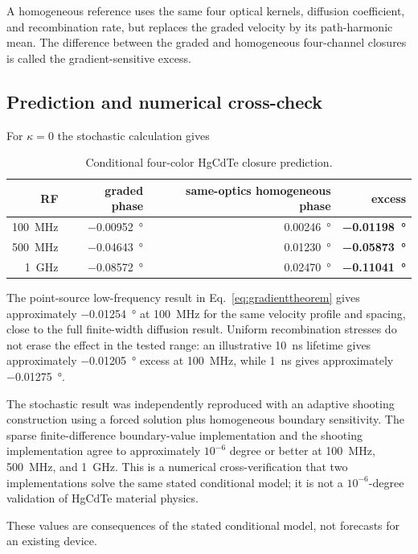\documentclass[11pt]{article}
\begin{document}
A homogeneous reference uses the same four optical kernels, diffusion coefficient, and recombination rate, but replaces the graded velocity by its path-harmonic mean. The difference between the graded and homogeneous four-channel closures is called the gradient-sensitive excess.

\subsection{Prediction and numerical cross-check}

For $\kappa=0$ the stochastic calculation gives
\begin{table}[H]
\centering
\caption{Conditional four-color HgCdTe closure prediction.}
\begin{tabular}{rrrr}
\toprule
RF & graded phase & same-optics homogeneous phase & excess \\
\midrule
\SI{100}{MHz} & \SI{-0.00952}{\degree} & \SI{+0.00246}{\degree} & \textbf{\SI{-0.01198}{\degree}} \\
\SI{500}{MHz} & \SI{-0.04643}{\degree} & \SI{+0.01230}{\degree} & \textbf{\SI{-0.05873}{\degree}} \\
\SI{1}{GHz} & \SI{-0.08572}{\degree} & \SI{+0.02470}{\degree} & \textbf{\SI{-0.11041}{\degree}} \\
\bottomrule
\end{tabular}
\label{tab:hgclosure}
\end{table}

The point-source low-frequency result in Eq.~\eqref{eq:gradienttheorem} gives approximately \SI{-0.01254}{\degree} at \SI{100}{MHz} for the same velocity profile and spacing, close to the full finite-width diffusion result. Uniform recombination stresses do not erase the effect in the tested range: an illustrative \SI{10}{ns} lifetime gives approximately \SI{-0.01205}{\degree} excess at \SI{100}{MHz}, while \SI{1}{ns} gives approximately \SI{-0.01275}{\degree}.

The stochastic result was independently reproduced with an adaptive shooting construction using a forced solution plus homogeneous boundary sensitivity. The sparse finite-difference boundary-value implementation and the shooting implementation agree to approximately $10^{-6}$ degree or better at \SI{100}{MHz}, \SI{500}{MHz}, and \SI{1}{GHz}. This is a numerical cross-verification that two implementations solve the same stated conditional model; it is not a $10^{-6}$-degree validation of HgCdTe material physics.

These values are consequences of the stated conditional model, not forecasts for an existing device.
\end{document}

